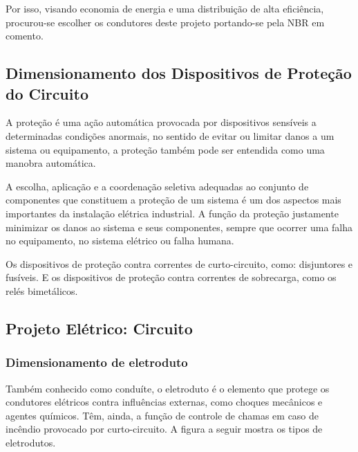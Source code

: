 Por isso, visando economia de energia e uma distribuição de alta eficiência, procurou-se escolher os condutores deste projeto portando-se pela NBR em comento.

\subsection{Dimensionamento dos Dispositivos de Proteção do Circuito}

A proteção é uma ação automática provocada por dispositivos sensíveis a determinadas condições anormais, no sentido de evitar ou limitar danos a um sistema ou equipamento, a proteção também pode ser entendida como uma manobra automática.

A escolha, aplicação e a coordenação seletiva adequadas ao conjunto de componentes que constituem a proteção de um sistema é um dos aspectos mais importantes da instalação elétrica industrial. A função da proteção justamente minimizar os danos ao sistema e seus componentes, sempre que ocorrer uma falha no equipamento, no sistema elétrico ou falha humana.

Os dispositivos de proteção contra correntes de curto-circuito, como: disjuntores e fusíveis. E os dispositivos de proteção contra correntes de sobrecarga, como os relés bimetálicos.

\subsection{Projeto Elétrico: Circuito}

\subsubsection{Dimensionamento de eletroduto}

Também conhecido como conduíte, o eletroduto é o elemento que protege os condutores elétricos contra influências externas, como choques mecânicos e agentes químicos. Têm, ainda, a função de controle de chamas em caso de incêndio provocado por curto-circuito. 
A figura a seguir mostra os tipos de eletrodutos.

